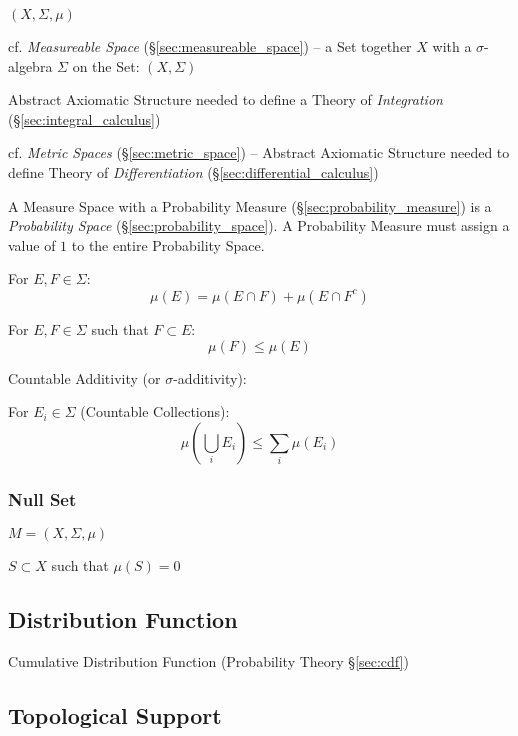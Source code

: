 $(X,\Sigma,\mu)$

\fist cf. \emph{Measureable Space} (\S\ref{sec:measureable_space}) -- a Set
together $X$ with a $\sigma$-algebra $\Sigma$ on the Set: $(X,\Sigma)$

Abstract Axiomatic Structure needed to define a Theory of \emph{Integration}
(\S\ref{sec:integral_calculus})

cf. \emph{Metric Spaces} (\S\ref{sec:metric_space}) -- Abstract Axiomatic
Structure needed to define Theory of \emph{Differentiation}
(\S\ref{sec:differential_calculus})

A Measure Space with a Probability Measure (\S\ref{sec:probability_measure}) is
a \emph{Probability Space} (\S\ref{sec:probability_space}). A Probability
Measure must assign a value of $1$ to the entire Probability Space.

For $E,F \in \Sigma$:
\[
  \mu(E) = \mu(E \cap F) + \mu(E \cap F^c)
\]

For $E,F \in \Sigma$ such that $F \subset E$:
\[
  \mu(F) \leq \mu(E)
\]

Countable Additivity (or $\sigma$-additivity): %

For $E_i \in \Sigma$ (Countable Collections):
\[
  \mu(\bigcup_i E_i) \leq \sum_i \mu(E_i)
\]



\subsubsection{Null Set}\label{sec:null_set}\hfill

$M = (X, \Sigma, \mu)$

$S \subset X$ such that $\mu(S) = 0$



\subsection{Distribution Function}\label{sec:distribution_function}

\fist Cumulative Distribution Function (Probability Theory \S\ref{sec:cdf})



\subsection{Topological Support}\label{sec:topological_support}

